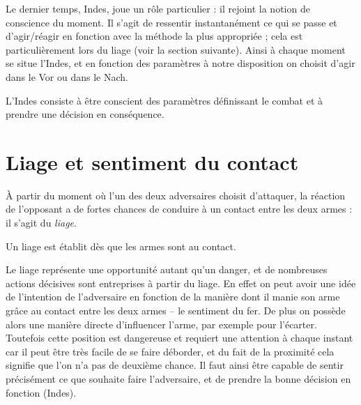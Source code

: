 
Le dernier temps, Indes, joue un rôle particulier : il rejoint la notion de conscience du moment.
Il s'agit de ressentir instantanément ce qui se passe et d'agir/réagir en fonction avec la méthode la plus appropriée ; cela est particulièrement lors du liage (voir la section suivante).
Ainsi à chaque moment se situe l'Indes, et en fonction des paramètres à notre disposition on choisit d'agir dans le Vor ou dans le Nach.


\begin{definition}

L'Indes consiste à être conscient des paramètres définissant le combat et à prendre une décision en conséquence.
\end{definition}


\section{Liage et sentiment du contact}


À partir du moment où l'un des deux adversaires choisit d'attaquer, la réaction de l'opposant a de fortes chances de conduire à un contact entre les deux armes : il s'agit du \emph{liage}.


\begin{definition}[Liage]
\label{conc:def:liage}

Un liage est établit dès que les armes sont au contact.
\end{definition}


Le liage représente une opportunité autant qu'un danger, et de nombreuses actions décisives sont entreprises à partir du liage.
En effet on peut avoir une idée de l'intention de l'adversaire en fonction de la manière dont il manie son arme grâce au contact entre les deux armes -- le sentiment du fer.
De plus on possède alors une manière directe d'influencer l'arme, par exemple pour l'écarter.
Toutefois cette position est dangereuse et requiert une attention à chaque instant car il peut être très facile de se faire déborder, et du fait de la proximité cela signifie que l'on n'a pas de deuxième chance.
Il faut ainsi être capable de sentir précisément ce que souhaite faire l'adversaire, et de prendre la bonne décision en fonction (Indes).


